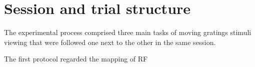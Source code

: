 \section{Session and trial structure}
\label{sec:sectiona}



The experimental process comprised three main tasks of moving gratings stimuli viewing that were followed one next to the other in the same session.

The first protocol regarded the mapping of RF
